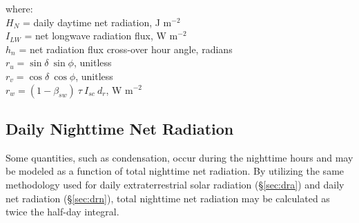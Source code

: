 \noindent where: \\
\indent $H_N$ = daily daytime net radiation, J m$^{-2}$ \\
\indent $I_{LW}$ = net longwave radiation flux, W m$^{-2}$\\
\indent $h_n$ = net radiation flux cross-over hour angle, radians\\
\indent $r_u = \sin\delta\: \sin\phi$, unitless \\
\indent $r_v = \cos\delta\: \cos\phi$, unitless \\
\indent $r_w = \left(1-\beta_{sw}\right)\:\tau\: I_{sc}\: d_r$, W m$^{-2}$\\

\subsection{Daily Nighttime Net Radiation}
\label{sec:drnn}
Some quantities, such as condensation, occur during the nighttime hours and may be modeled as a function of total nighttime net radiation. 
By utilizing the same methodology used for daily extraterrestrial solar radiation (\S \ref{sec:dra}) and daily net radiation (\S \ref{sec:drn}), total nighttime net radiation may be calculated as twice the half-day integral.

